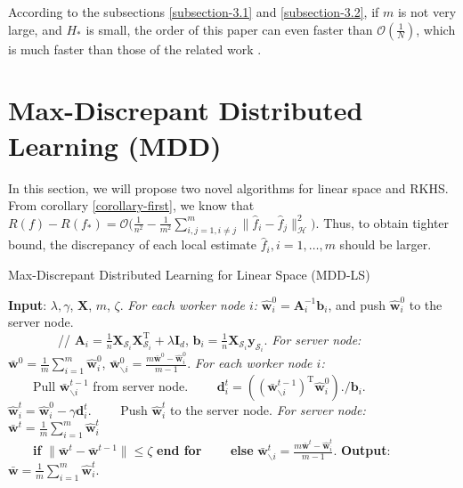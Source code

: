 \documentclass{article}
\begin{document}
According to the subsections \ref{subsection-3.1} and \ref{subsection-3.2},
if $m$ is not very large, and $H_\ast$ is small,
the order of this paper can even faster than $\mathcal{O}\left(\frac{1}{N}\right)$,
which is much faster than those of the related work \cite{zhang2012communication,Zhang2013,lin2017distributed}.

\section{Max-Discrepant Distributed Learning (MDD)}
In this section, we will propose two novel algorithms for linear space and RKHS.
From corollary \ref{corollary-first},  we know that
  $
     R(f)-R(f_\ast)=\mathcal{O}\Big(\frac{1}{n^2}-\frac{1}{m^2}\sum_{i,j=1,i\not=j}^m\|\hat{f}_i-\hat{f}_j\|_\mathcal{H}^2\Big).
$
Thus, to obtain tighter bound, the discrepancy of each local estimate $\hat{f}_i, i=1,\ldots,m$ should be larger.

\begin{algorithm}
    \caption{Max-Discrepant Distributed Learning for Linear Space (MDD-LS)}
    \label{alg:RMMls}
    \begin{algorithmic}[1]
    \STATE \textbf{Input}: $\lambda,\gamma$, $\mathbf X$, $m$, $\zeta$.
     \STATE \emph{For each worker node $i$:} $\hat{\mathbf w}_i^0=\mathbf A_i^{-1} \mathbf b_i$, and push $\hat{\mathbf w}_i^0$ to the server node.\\
         ~~~~~~~~// $\mathbf A_i=\frac{1}{n}\mathbf X_{\mathcal{S}_i}\mathbf X_{\mathcal{S}_i}^\mathrm{T}+
            \lambda \mathbf I_d$, $\mathbf b_i= \frac{1}{n}\mathbf X_{\mathcal{S}_i}\mathbf y_{\mathcal{S}_i}$.
    \STATE \emph{For server node:}
    $\bar{\mathbf w}^0=\frac{1}{m}\sum_{i=1}^m\hat{\mathbf w}_i^0$,
    $\bar{\mathbf w}^{0}_{\backslash i}=\frac{m\bar{\mathbf w}^{0}-\hat{\mathbf w}_i^0}{m-1}$.
    \STATE  \emph{For each worker node $i$:} \\
    ~~~~Pull $\bar{\mathbf w}^{t-1}_{\backslash i}$ from server node.
    \STATE ~~~~$\mathbf d_i^t=\left(\left(\bar{\mathbf w}^{t-1}_{\backslash i}\right)^\mathrm{T}\hat{\mathbf w}_i^{0}\right)./\mathbf b_i$.
     ~~~~$\hat{\mathbf w}_i^t=\hat{\mathbf w}_i^0-\gamma\mathbf d_i^t$.
    \STATE ~~~~Push $\hat{\mathbf w}_i^t$ to the server node.
     \STATE \emph{For server node:}
     \STATE ~~~~$\bar{\mathbf w}^t=\frac{1}{m}\sum_{i=1}^m\hat{\mathbf w}_i^t$\\
      ~~~~\textbf{if} {$\|\bar{\mathbf w}^{t}-\bar{\mathbf w}^{t-1}\|\leq \zeta$} \textbf{end for}
      \STATE ~~~~\textbf{else} $\bar{\mathbf w}^{t}_{\backslash i}=\frac{m\bar{\mathbf w}^{t}-\hat{\mathbf w}_i^t}{m-1}$.
    \ENDFOR
    \STATE \textbf{Output}: $\bar{\mathbf w}=\frac{1}{m}\sum_{i=1}^m\hat{\mathbf w}_i^t$.
    \end{algorithmic}
\end{algorithm}
\end{document}
